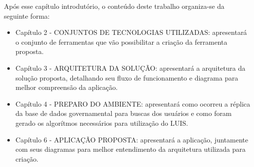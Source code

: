 Após esse capítulo introdutório, o conteúdo deste trabalho organiza-se da seguinte forma:
	\begin{itemize}
		\item{Capítulo 2 - \uppercase{Conjuntos de tecnologias utilizadas}: apresentará o conjunto de ferramentas que vão possibilitar a criação da ferramenta proposta.}
		\item{Capítulo 3 - \uppercase{Arquitetura da solução}: apresentará a arquitetura da solução proposta, detalhando seu fluxo de funcionamento e diagrama para melhor compreensão da aplicação.}
		\item{Capítulo 4 - \uppercase{Preparo do ambiente}: apresentará como ocorreu a réplica da base de dados governamental para buscas dos usuários e como foram gerado os algorítmos necessários para utilização do LUIS.}
		\item{Capítulo 6 - \uppercase{Aplicação proposta}: apresentará a aplicação, juntamente com seus diagramas para melhor entendimento da arquitetura utilizada para criação.}
	\end{itemize}
